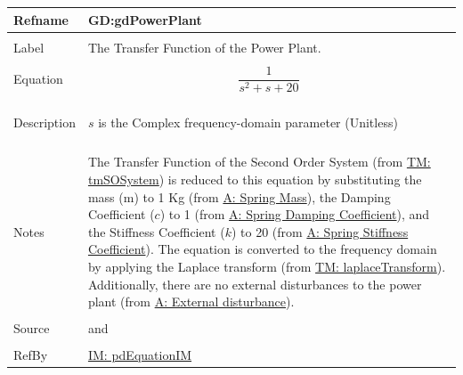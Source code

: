 \documentclass[12pt]{article}
\begin{document}
\vspace{\baselineskip}
\noindent
\begin{minipage}{\textwidth}
\begin{tabular}{>{\raggedright}p{}>{\raggedright\arraybackslash}p{}}
\toprule \textbf{Refname} & \textbf{GD:gdPowerPlant}
\label{GD:gdPowerPlant}
\\ \midrule \\
Label & The Transfer Function of the Power Plant.
        
\\ \midrule \\
Equation & \begin{displaymath}
           \frac{1}{s^{2}+s+20}
           \end{displaymath}
\\ \midrule \\
Description & \begin{symbDescription}
              \item{$s$ is the Complex frequency-domain parameter (Unitless)}
              \end{symbDescription}
\\ \midrule \\
Notes & The Transfer Function of the Second Order System (from \hyperref[TM:tmSOSystem]{TM: tmSOSystem}) is reduced to this equation by substituting the mass (m) to 1 Kg (from \hyperref[massSpring]{A: Spring Mass}), the Damping Coefficient ($c$) to 1 (from \hyperref[dampingCoeffSpring]{A: Spring Damping Coefficient}), and the Stiffness Coefficient ($k$) to 20 (from \hyperref[stiffnessCoeffSpring]{A: Spring Stiffness Coefficient}). The equation is converted to the frequency domain by applying the Laplace transform (from \hyperref[TM:laplaceTransform]{TM: laplaceTransform}). Additionally, there are no external disturbances to the power plant (from \hyperref[externalDisturb]{A: External disturbance}).
        
\\ \midrule \\
Source & \cite{pidWiki} and \cite{abbasi2015}
         
\\ \midrule \\
RefBy & \hyperref[IM:pdEquationIM]{IM: pdEquationIM}
        
\\ \bottomrule
\end{tabular}
\end{minipage}
\end{document}

